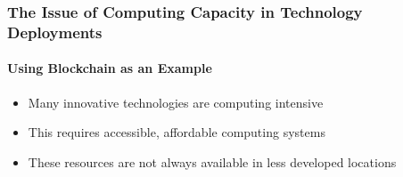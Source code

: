 \begin{frame}
  \frametitle{The Issue of Computing Capacity in Technology Deployments}
  \framesubtitle{Using Blockchain as an Example}
  \begin{itemize}
    \item<1->Many innovative technologies are computing intensive


    \item<2->This requires accessible, affordable computing systems


    \item<3->These resources are not always available in less developed locations


  \end{itemize}
\end{frame}
